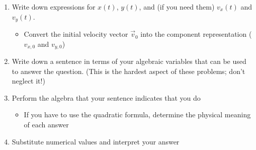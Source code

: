 \documentclass[12pt]{article}
\begin{document}
\begin{enumerate}
\item Write down expressions for $x(t)$, $y(t)$, and (if you need them) $v_x(t)$ and $v_y(t)$.
\begin{itemize}
\item Convert the initial velocity vector $\vec v_0$ into the component representation ($v_{x,0}$ and $v_{y,0}$)
\end{itemize}
\item Write down a sentence in terms of your algebraic variables that can be used
to answer the question. (This is the hardest aspect of these problems; don't neglect
it!)
\item Perform the algebra that your sentence indicates that you do
\begin{itemize}
\item If you have to use the quadratic formula, determine the physical
meaning of each answer
\end{itemize}
\item Substitute numerical values and interpret your answer
\end{enumerate}
\end{document}
